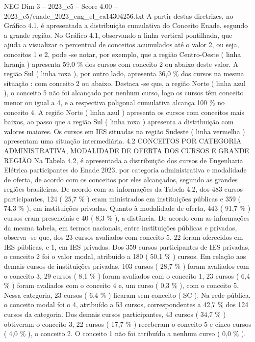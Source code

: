 \begin{textsample}{NEG Dim 3 – 2023\_c5 – Score 4.00 – 2023\_c5/enade\_2023\_eng\_el\_ca14304256.txt}
A partir destas diretrizes, no Gráfico 4.1, é apresentada a distribuição cumulativa do Conceito Enade, segundo a grande região.
No Gráfico 4.1, observando a linha vertical pontilhada, que ajuda a visualizar o percentual de conceitos acumulados até o valor 2, ou seja, conceitos 1 e 2, pode -se notar, por exemplo, que a região Centro-Oeste ( linha laranja ) apresenta 59,0 \% dos cursos com conceito 2 ou abaixo deste valor.
A região Sul ( linha roxa ), por outro lado, apresenta 36,0 \% dos cursos na mesma situação : com conceito 2 ou abaixo.
Destaca -se que, a região Norte ( linha azul ), o conceito 5 não foi alcançado por nenhum curso, logo os cursos têm conceito menor ou igual a 4, e a respectiva poligonal cumulativa alcança 100 \% no conceito 4.
A região Norte ( linha azul ) apresenta os cursos com conceitos mais baixos, ao passo que a região Sul ( linha roxa ) apresenta a distribuição com valores maiores.
Os cursos em IES situadas na região Sudeste ( linha vermelha ) apresentam uma situação intermediária. 4.2 CONCEITOS POR CATEGORIA ADMINISTRATIVA, MODALIDADE DE OFERTA DOS CURSOS E GRANDE REGIÃO Na Tabela 4.2, é apresentada a distribuição dos cursos de Engenharia Elétrica participantes do Enade 2023, por categoria administrativa e modalidade de oferta, de acordo com os conceitos por eles alcançados, segundo as grandes regiões brasileiras.
De acordo com as informações da Tabela 4.2, dos 483 cursos participantes, 124 ( 25,7 \% ) eram ministrados em instituições públicas e 359 ( 74,3 \% ), em instituições privadas.
Quanto à modalidade de oferta, 443 ( 91,7 \% ) cursos eram presenciais e 40 ( 8,3 \% ), a distância.
De acordo com as informações da mesma tabela, em termos nacionais, entre instituições públicas e privadas, observa -se que, dos 23 cursos avaliados com conceito 5, 22 foram oferecidos em IES públicas, e 1, em IES privadas.
Dos 359 cursos participantes de IES privadas, o conceito 2 foi o valor modal, atribuído a 180 ( 50,1 \% ) cursos.
Em relação aos demais cursos de instituições privadas, 103 cursos ( 28,7 \% ) foram avaliados com o conceito 3, 29 cursos ( 8,1 \% ) foram avaliados com o conceito 1, 23 cursos ( 6,4 \% ) foram avaliados com o conceito 4 e, um curso ( 0,3 \% ), com o conceito 5.
Nessa categoria, 23 cursos ( 6,4 \% ) ficaram sem conceito ( SC ).
Na rede pública, o conceito modal foi o 4, atribuído a 53 cursos, correspondentes a 42,7 \% dos 124 cursos da categoria.
Dos demais cursos participantes, 43 cursos ( 34,7 \% ) obtiveram o conceito 3, 22 cursos ( 17,7 \% ) receberam o conceito 5 e cinco cursos ( 4,0 \% ), o conceito 2.
O conceito 1 não foi atribuído a nenhum curso ( 0,0 \% ).

\end{textsample}
